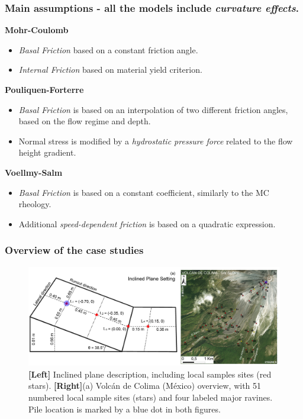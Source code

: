 \documentclass{beamer}
\begin{document}
\begin{frame}
\frametitle{Main assumptions - \small{all the models include \textit{curvature effects}}.}
\textbf{Mohr-Coulomb}
\begin{itemize}
\item \textit{Basal Friction} based on a constant friction angle.
\item \textit{Internal Friction} based on material yield criterion.
\end{itemize}

\textbf{Pouliquen-Forterre}
\begin{itemize}
\item \textit{Basal Friction} is based on an interpolation of two different friction angles, based on the flow regime and depth.
\item Normal stress is modified by a \textit{hydrostatic pressure force} related to the flow height gradient.
\end{itemize}

\textbf{Voellmy-Salm}
\begin{itemize}
\item \textit{Basal Friction} is based on a constant coefficient, similarly to the MC rheology.
\item Additional \textit{speed-dependent friction} is based on a quadratic expression.
\end{itemize}
\end{frame}


\begin{frame}
\frametitle{Overview of the case studies}
\begin{figure}
\includegraphics[width=1.05\textwidth]{ChineseFig.jpeg}
    \caption{{\bf [Left]} Inclined plane description, including local samples sites (red stars). {\bf [Right]}(a) Volc{\'a}n de Colima (M{\'e}xico) overview, with 51 numbered local sample sites (stars) and four labeled major ravines. Pile location is marked by a blue dot in both figures.}
\end{figure}
\end{frame}
\end{document}

